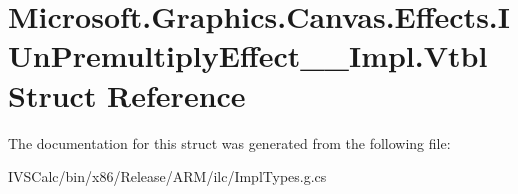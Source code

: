 \hypertarget{struct_microsoft_1_1_graphics_1_1_canvas_1_1_effects_1_1_i_un_premultiply_effect_____impl_1_1_vtbl}{}\section{Microsoft.\+Graphics.\+Canvas.\+Effects.\+I\+Un\+Premultiply\+Effect\+\_\+\+\_\+\+Impl.\+Vtbl Struct Reference}
\label{struct_microsoft_1_1_graphics_1_1_canvas_1_1_effects_1_1_i_un_premultiply_effect_____impl_1_1_vtbl}


The documentation for this struct was generated from the following file\+:\begin{DoxyCompactItemize}
\item 
I\+V\+S\+Calc/bin/x86/\+Release/\+A\+R\+M/ilc/Impl\+Types.\+g.\+cs\end{DoxyCompactItemize}
